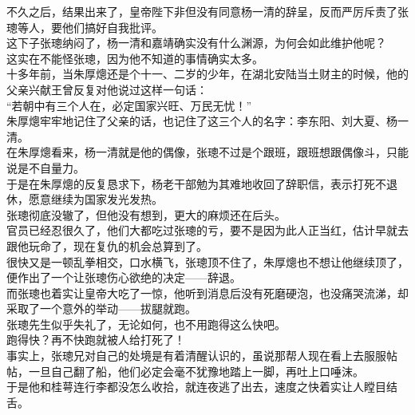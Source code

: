 \begin{multicols}{\theparacolNo}
不久之后，结果出来了，皇帝陛下非但没有同意杨一清的辞呈，反而严厉斥责了张璁等人，要他们搞好自我批评。\\

这下子张璁纳闷了，杨一清和嘉靖确实没有什么渊源，为何会如此维护他呢？\\

这实在不能怪张璁，因为他不知道的事情确实太多。\\

十多年前，当朱厚熜还是个十一、二岁的少年，在湖北安陆当土财主的时候，他的父亲兴献王曾反复对他说过这样一句话：\\

“若朝中有三个人在，必定国家兴旺、万民无忧！”\\

朱厚熜牢牢地记住了父亲的话，也记住了这三个人的名字：李东阳、刘大夏、杨一清。\\

在朱厚熜看来，杨一清就是他的偶像，张璁不过是个跟班，跟班想跟偶像斗，只能说是不自量力。\\

于是在朱厚熜的反复恳求下，杨老干部勉为其难地收回了辞职信，表示打死不退休，愿意继续为国家发光发热。\\

张璁彻底没辙了，但他没有想到，更大的麻烦还在后头。\\

官员已经忍很久了，他们大都吃过张璁的亏，要不是因为此人正当红，估计早就去跟他玩命了，现在复仇的机会总算到了。\\

很快又是一顿乱拳相交，口水横飞，张璁顶不住了，朱厚熜也不想让他继续顶了，便作出了一个让张璁伤心欲绝的决定——辞退。\\

而张璁也着实让皇帝大吃了一惊，他听到消息后没有死磨硬泡，也没痛哭流涕，却采取了一个意外的举动——拔腿就跑。\\

张璁先生似乎失礼了，无论如何，也不用跑得这么快吧。\\

跑得快？再不快跑就被人给打死了！\\

事实上，张璁兄对自己的处境是有着清醒认识的，虽说那帮人现在看上去服服帖帖，一旦自己翻了船，他们必定会毫不犹豫地踏上一脚，再吐上口唾沫。\\

于是他和桂萼连行李都没怎么收拾，就连夜逃了出去，速度之快着实让人瞠目结舌。\\


\end{multicols}
